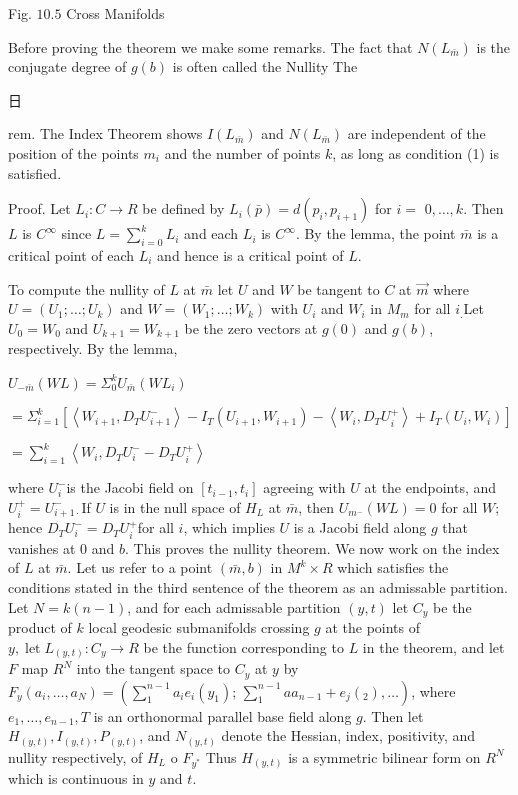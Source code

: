 \documentclass[10pt]{article}
\begin{document}
Fig. $10.5$ Cross Manifolds

Before proving the theorem we make some remarks. The fact that $N\left(L_{\bar{m}}\right)$ is the conjugate degree of $g(b)$ is often called the Nullity The\begin{CJK}{UTF8}{mj}日\end{CJK}rem. The Index Theorem shows $I\left(L_{\bar{m}}\right)$ and $N\left(L_{\bar{m}}\right)$ are independent of the position of the points $m_{i}$ and the number of points $k$, as long as condition (1) is satisfied.

Proof. Let $L_{i}: C \rightarrow R$ be defined by $L_{i}(\bar{p})=d\left(p_{i}, p_{i+1}\right)$ for $i=$ $0, \ldots, k$. Then $L$ is $C^{\infty}$ since $L=\sum_{i=0}^{k} L_{i}$ and each $L_{i}$ is $C^{\infty}$. By the lemma, the point $\bar{m}$ is a critical point of each $L_{i}$ and hence is a critical point of $L$.

To compute the nullity of $L$ at $\bar{m}$ let $U$ and $W$ be tangent to $C$ at $\vec{m}$ where $U=\left(U_{1} ; \ldots ; U_{k}\right)$ and $W=\left(W_{1} ; \ldots ; W_{k}\right)$ with $U_{i}$ and $W_{i}$ in $M_{m}$ for all $i_{.}$Let $U_{0}=W_{0}$ and $U_{k+1}=W_{k+1}$ be the zero vectors at $g(0)$ and $g(b)$, respectively. By the lemma,

$U_{-\bar{m}}(W L)=\Sigma_{0}^{k} U_{\bar{m}}\left(W L_{i}\right)$

$=\Sigma_{i=1}^{k}\left[\left\langle W_{i+1}, D_{T} U_{i+1}^{-}\right\rangle-I_{T}\left(U_{i+1}, W_{i+1}\right)-\left\langle W_{i}, D_{T} U_{i}^{+}\right\rangle+I_{T}\left(U_{i}, W_{i}\right)\right]$

$=\sum_{i=1}^{k}\left\langle W_{i}, D_{T} U_{i}^{-}-D_{T} U_{i}^{+}\right\rangle$

where $U_{i}^{-}$is the Jacobi field on $\left[t_{i-1}, t_{i}\right]$ agreeing with $U$ at the endpoints, and $U_{i}^{+}=U_{i+1 \cdot}^{-}$If $U$ is in the null space of $H_{L}$ at $\bar{m}$, then $U_{m^{-}}(W L)=0$ for all $W$; hence $D_{T} U_{i}^{-}=D_{T} U_{i}^{+}$for all $i$, which implies $U$ is a Jacobi field along $g$ that vanishes at 0 and $b$. This proves the nullity theorem. We now work on the index of $L$ at $\bar{m}$. Let us refer to a point $(\bar{m}, b)$ in $M^{k} \times R$ which satisfies the conditions stated in the third sentence of the theorem as an admissable partition. Let $N=k(n-1)$, and for each admissable partition $(y, t)$ let $C_{y}$ be the product of $k$ local geodesic submanifolds crossing $g$ at the points of $y, \operatorname{let} L_{(y, t)}: C_{y} \rightarrow R$ be the function corresponding to $L$ in the theorem, and let $F$ map $R^{N}$ into the tangent space to $C_{y}$ at $y$ by $F_{y}\left(a_{i}, \ldots, a_{N}\right)=\left(\sum_{1}^{n-1} a_{i} e_{i}\left(y_{1}\right)\right.$; $\left.\sum_{1}^{n-1} a a_{n-1}+e_{j}\left(_{2}\right), \ldots\right)$, where $e_{1}, \ldots, e_{n-1}, T$ is an orthonormal parallel base field along $g$. Then let $H_{(y, t)}, I_{(y, t)}, P_{(y, t)}$, and $N_{(y, t)}$ denote the Hessian, index, positivity, and nullity respectively, of $H_{L}$ o $F_{y^{*}}$ Thus $H_{(y, t)}$ is a symmetric bilinear form on $R^{N}$ which is continuous in $y$ and $t .$
\end{document}
